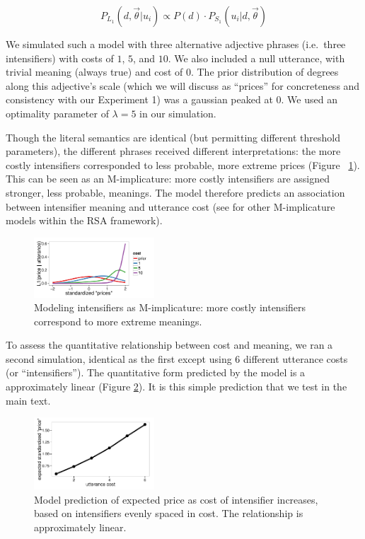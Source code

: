 $$ P_{L_1}(d, \vec{\theta} | u_i) \propto P(d) \cdot P_{S_1}(u_i | d, \vec{\theta}) $$

We simulated such a model with three alternative adjective phrases (i.e.~three intensifiers) with costs of $1$, $5$, and $10$. We also included a null utterance, with trivial meaning (always true) and cost of $0$. The prior distribution of degrees along this adjective's scale (which we will discuss as ``prices'' for concreteness and consistency with our Experiment 1) was a gaussian peaked at $0$.
We used an optimality parameter of $\lambda=5$ in our simulation. 

Though the literal semantics are identical (but permitting different threshold parameters), the different phrases received different interpretations: the more costly intensifiers corresponded to less probable, more extreme prices (Figure ~\ref{model}).
This can be seen as an M-implicature: more costly intensifiers are assigned stronger, less probable, meanings. 
The model therefore predicts an association between intensifier meaning and utterance cost (see  for other M-implicature models within the RSA framework).

\begin{figure}[tbh]
\begin{center}
\includegraphics[width=0.4\textwidth]{model_results.pdf}
\end{center}
\caption{Modeling intensifiers as M-implicature: more costly intensifiers correspond to more extreme meanings.} 
\label{model}
\end{figure}

To assess the quantitative relationship between cost and meaning, we ran a second simulation, identical as the first except using 6 different utterance costs (or ``intensifiers'').
The quantitative form predicted by the model is a approximately linear (Figure \ref{model-heights}).
It is this simple prediction that we test in the main text.

\begin{figure}[tbh]
\begin{center}\includegraphics[width=0.4\textwidth]{height-by-cost.pdf}
\end{center}
\caption{Model prediction of expected price as cost of intensifier increases, based on intensifiers evenly spaced in cost. The relationship is approximately linear.} 
\label{model-heights}
\end{figure}




